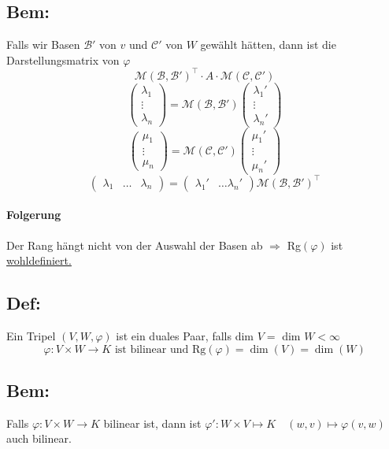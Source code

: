 \documentclass[titlepage,12pt,a4paper,ngerman]{report}
\newcommand{\tx}[1]{\textrm{#1}}
\begin{document}
\subsection{Bem:}
Falls wir Basen $ \mathcal{B}' $ von $ v $ und $ \mathcal{C}' $ von $ W $ gewählt hätten, dann ist die Darstellungsmatrix von $ \varphi $
$$\mathcal{M}(\mathcal{B},\mathcal{B}')^\top \cdot A \cdot \mathcal{M}(\mathcal{C}, \mathcal{C}')$$
$$ \begin{pmatrix}
\lambda_1\\
\vdots\\
\lambda_n
\end{pmatrix} = \mathcal{M}(\mathcal{B},\mathcal{B}') \begin{pmatrix}
\lambda_1'\\
\vdots\\
\lambda_n'
\end{pmatrix}$$
$$ \begin{pmatrix}
\mu_1\\
\vdots\\
\mu_n
\end{pmatrix} = \mathcal{M}(\mathcal{C},\mathcal{C}') \begin{pmatrix}
\mu_1'\\
\vdots\\
\mu_n'
\end{pmatrix}$$
$$\begin{pmatrix}
\lambda_1 & \dots & \lambda_n
\end{pmatrix} = \begin{pmatrix}
\lambda_1' & \dots \lambda_n'
\end{pmatrix} \mathcal{M}(\mathcal{B},\mathcal{B}')^\top$$

\paragraph{Folgerung}
Der Rang hängt nicht von der Auswahl der Basen ab $\Rightarrow$ Rg$(\varphi)$ ist \underline{wohldefiniert.}

\subsection{Def:}
Ein Tripel $(V,W,\varphi)$ ist ein duales Paar, falls dim $V =$ dim $W < \infty $
$$\varphi: V \times W \to K \tx{ ist bilinear und Rg}(\varphi) = \dim (V) = \dim (W)$$


\subsection*{Bem:} Falls $ \varphi: V \times W \to K $ bilinear ist, dann ist $ \varphi': W \times V \mapsto K \quad (w,v) \mapsto \varphi(v,w)$ auch bilinear.
\end{document}

